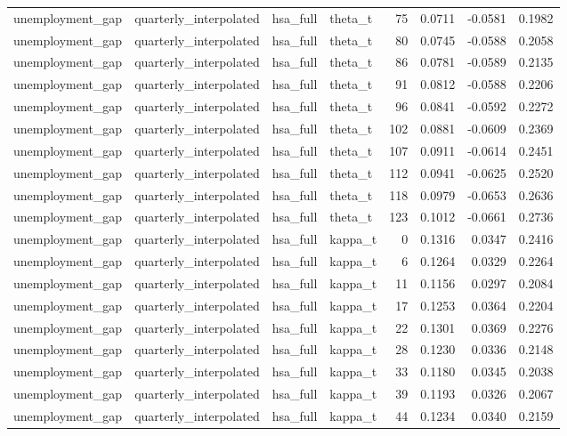 \begin{tabular}{llllrrrr}
unemployment\_gap & quarterly\_interpolated & hsa\_full & theta\_t & 75 & 0.0711 & -0.0581 & 0.1982 \\
unemployment\_gap & quarterly\_interpolated & hsa\_full & theta\_t & 80 & 0.0745 & -0.0588 & 0.2058 \\
unemployment\_gap & quarterly\_interpolated & hsa\_full & theta\_t & 86 & 0.0781 & -0.0589 & 0.2135 \\
unemployment\_gap & quarterly\_interpolated & hsa\_full & theta\_t & 91 & 0.0812 & -0.0588 & 0.2206 \\
unemployment\_gap & quarterly\_interpolated & hsa\_full & theta\_t & 96 & 0.0841 & -0.0592 & 0.2272 \\
unemployment\_gap & quarterly\_interpolated & hsa\_full & theta\_t & 102 & 0.0881 & -0.0609 & 0.2369 \\
unemployment\_gap & quarterly\_interpolated & hsa\_full & theta\_t & 107 & 0.0911 & -0.0614 & 0.2451 \\
unemployment\_gap & quarterly\_interpolated & hsa\_full & theta\_t & 112 & 0.0941 & -0.0625 & 0.2520 \\
unemployment\_gap & quarterly\_interpolated & hsa\_full & theta\_t & 118 & 0.0979 & -0.0653 & 0.2636 \\
unemployment\_gap & quarterly\_interpolated & hsa\_full & theta\_t & 123 & 0.1012 & -0.0661 & 0.2736 \\
unemployment\_gap & quarterly\_interpolated & hsa\_full & kappa\_t & 0 & 0.1316 & 0.0347 & 0.2416 \\
unemployment\_gap & quarterly\_interpolated & hsa\_full & kappa\_t & 6 & 0.1264 & 0.0329 & 0.2264 \\
unemployment\_gap & quarterly\_interpolated & hsa\_full & kappa\_t & 11 & 0.1156 & 0.0297 & 0.2084 \\
unemployment\_gap & quarterly\_interpolated & hsa\_full & kappa\_t & 17 & 0.1253 & 0.0364 & 0.2204 \\
unemployment\_gap & quarterly\_interpolated & hsa\_full & kappa\_t & 22 & 0.1301 & 0.0369 & 0.2276 \\
unemployment\_gap & quarterly\_interpolated & hsa\_full & kappa\_t & 28 & 0.1230 & 0.0336 & 0.2148 \\
unemployment\_gap & quarterly\_interpolated & hsa\_full & kappa\_t & 33 & 0.1180 & 0.0345 & 0.2038 \\
unemployment\_gap & quarterly\_interpolated & hsa\_full & kappa\_t & 39 & 0.1193 & 0.0326 & 0.2067 \\
unemployment\_gap & quarterly\_interpolated & hsa\_full & kappa\_t & 44 & 0.1234 & 0.0340 & 0.2159 \\

\end{tabular}
